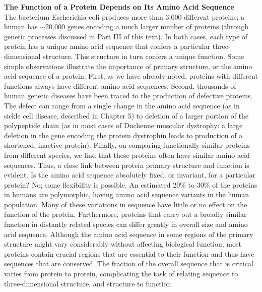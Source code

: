 \textbf{The Function of a Protein Depends on Its Amino Acid Sequence}\\
The bacterium Escherichia coli produces more than 3,000 different proteins; a human has $\sim$20,000 genes encoding a much larger number of proteins (through genetic processes discussed in Part III of this text). In both cases, each type of protein has a unique amino acid sequence that confers a particular three-dimensional structure. This structure in turn confers a unique function. Some simple observations illustrate the importance of primary structure, or the amino acid sequence of a protein. First, as we have already noted, proteins with different functions always have different amino acid sequences. Second, thousands of human genetic diseases have been traced to the production of defective proteins. The defect can range from a single change in the amino acid sequence (as in sickle cell disease, described in Chapter 5) to deletion of a larger portion of the polypeptide chain (as in most cases of Duchenne muscular dystrophy: a large deletion in the gene encoding the protein dystrophin leads to production of a shortened, inactive protein). 
Finally, on comparing functionally similar proteins from different species, we find that these proteins often have similar amino acid sequences.
Thus, a close link between protein primary structure and function is evident. Is the amino acid sequence absolutely fixed, or invariant, for a particular protein? No; some flexibility is possible. An estimated 20\% to 30\% of the proteins in humans are polymorphic, having amino acid sequence variants in the human population. Many of these variations in sequence have little or no effect on the function of the protein. Furthermore, proteins that carry out a broadly similar function in distantly related species can differ greatly in overall size and amino acid sequence. Although the amino acid sequence in some regions of the primary structure might vary considerably without affecting biological function, most proteins contain crucial regions that are essential to their function and thus have sequences that are conserved. The fraction of the overall sequence that is critical varies from protein to protein, complicating the task of relating sequence to three-dimensional structure, and structure to function. 


